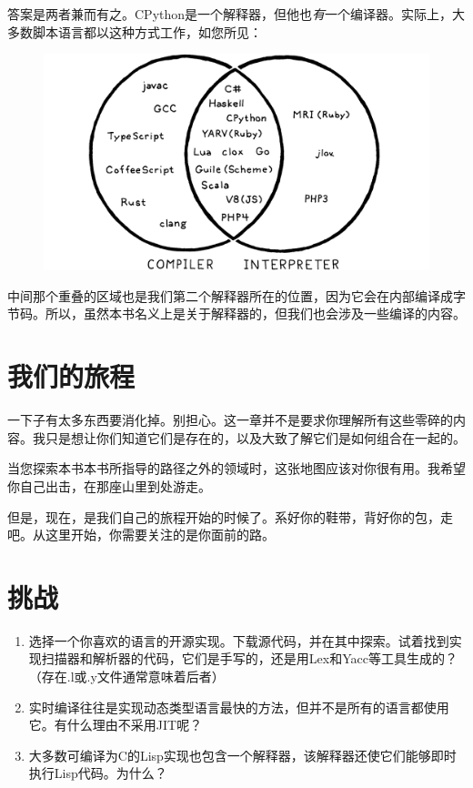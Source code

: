 \documentclass[cn,11pt,chinese]{elegantbook}
\begin{document}
答案是两者兼而有之。CPython是一个解释器，但他也\textit{有}一个编译器。实际上，大多数脚本语言都以这种方式工作，如您所见：

\begin{figure}[htbp]
  \centering
  \includegraphics[width=\textwidth]{image/a-map-of-the-territory/venn.png}
\end{figure}

中间那个重叠的区域也是我们第二个解释器所在的位置，因为它会在内部编译成字节码。所以，虽然本书名义上是关于解释器的，但我们也会涉及一些编译的内容。

\section{我们的旅程}

一下子有太多东西要消化掉。别担心。这一章并不是要求你理解所有这些零碎的内容。我只是想让你们知道它们是存在的，以及大致了解它们是如何组合在一起的。

当您探索本书本书所指导的路径之外的领域时，这张地图应该对你很有用。我希望你自己出击，在那座山里到处游走。

但是，现在，是我们自己的旅程开始的时候了。系好你的鞋带，背好你的包，走吧。从这里开始，你需要关注的是你面前的路。

\section{挑战}

\begin{enumerate}
  \item 选择一个你喜欢的语言的开源实现。下载源代码，并在其中探索。试着找到实现扫描器和解析器的代码，它们是手写的，还是用Lex和Yacc等工具生成的？（存在.l或.y文件通常意味着后者）
  \item 实时编译往往是实现动态类型语言最快的方法，但并不是所有的语言都使用它。有什么理由不采用JIT呢？
  \item 大多数可编译为C的Lisp实现也包含一个解释器，该解释器还使它们能够即时执行Lisp代码。为什么？
\end{enumerate}
\end{document}
